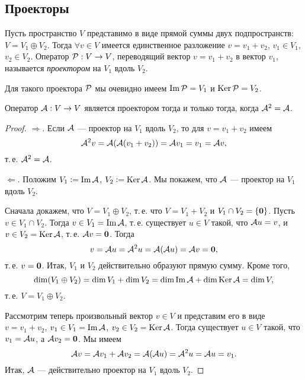 \subsection{Проекторы}

\setcounter{definition}{0}
\setcounter{proposal}{0}
\setcounter{lemma}{0}
\setcounter{theorem}{0}

\begin{definition}
    Пусть пространство $V$ представимо в виде прямой суммы двух подпространств: $V = V_1 \oplus V_2$. Тогда $\forall v \in V$ имеется единственное разложение $v = v_1 + v_2$, $v_1 \in V_1$, $v_2 \in V_2$. Оператор $\P: V \to V$, переводящий вектор $v = v_1 + v_2$ в вектор $v_1$, называется \textit{проектором} на $V_1$ вдоль $V_2$.
\end{definition}

Для такого проектора $\P$ мы очевидно имеем $\Im\P = V_1$ и $\Ker\P = V_2$.

\begin{theorem}
    Оператор $\A: V \to V$ является проектором тогда и только тогда, когда $\A^2 = \A$.
\end{theorem}

\begin{proof}
    $\Rightarrow$. Если $\A$ --- проектор на $V_1$ вдоль $V_2$, то для $v = v_1 + v_2$ имеем
    \[
        \A^2v = \A(\A(v_1 + v_2)) = \A v_1 = v_1 = \A v,
    \]
    т.\,е. $\A^2 = \A$.

    $\Leftarrow$. Положим $V_1 \vcentcolon = \Im\A$, $V_2 \vcentcolon = \Ker\A$. Мы покажем, что $\A$ --- проектор на $V_1$ вдоль $V_2$.

    Сначала докажем, что $V = V_1 \oplus V_2$, т.\,е. что $V = V_1 + V_2$ и $V_1 \cap V_2 = \{\bs{0}\}$. Пусть $v \in V_1 \cap V_2$. Тогда $v \in V_1 = \Im\A$, т.\,е. существует $u \in V$ такой, что $\A u = v$, и $v \in V_2 = \Ker\A$, т.\,е. $\A v = \bs{0}$. Тогда
    \[
        v = \A u = \A^2 u = \A(\A u) = \A v = \bs{0},
    \]
    т.\,е. $v = \bs{0}$. Итак, $V_1$ и $V_2$ действительно образуют прямую сумму. Кроме того,
    \[
        \dim(V_1 \oplus V_2) = \dim V_1 + \dim V_2 = \dim\Im\A + \dim\Ker\A = \dim V,
    \]
    т.\,е. $V = V_1 \oplus V_2$.

    Рассмотрим теперь произвольный вектор $v \in V$ и представим его в виде $v = v_1 + v_2$, $v_1 \in V_1 = \Im\A$, $v_2 \in V_2 = \Ker\A$. Тогда существует $u \in V$ такой, что $v_1 = \A u$, а $\A v_2 = \bs{0}$. Мы имеем
    \[
        \A v = \A v_1 + \A v_2 = \A(\A u) = \A^2u = \A u = v_1.
    \]
    Итак, $\A$ --- действительно проектор на $V_1$ вдоль $V_2$.
\end{proof}

